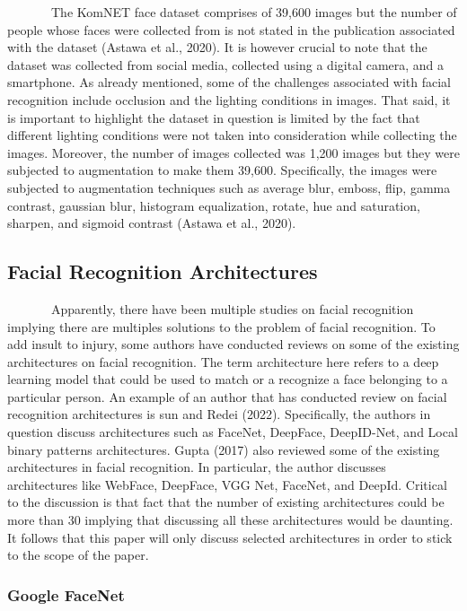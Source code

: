 \documentclass[
  12pt,
]{article}
\begin{document}
~~~~~~~The KomNET face dataset comprises of 39,600 images but the number
of people whose faces were collected from is not stated in the
publication associated with the dataset (Astawa et al., 2020). It is
however crucial to note that the dataset was collected from social
media, collected using a digital camera, and a smartphone. As already
mentioned, some of the challenges associated with facial recognition
include occlusion and the lighting conditions in images. That said, it
is important to highlight the dataset in question is limited by the fact
that different lighting conditions were not taken into consideration
while collecting the images. Moreover, the number of images collected
was 1,200 images but they were subjected to augmentation to make them
39,600. Specifically, the images were subjected to augmentation
techniques such as average blur, emboss, flip, gamma contrast, gaussian
blur, histogram equalization, rotate, hue and saturation, sharpen, and
sigmoid contrast (Astawa et al., 2020).

\subsection{Facial Recognition
Architectures}\label{facial-recognition-architectures}

~~~~~~~Apparently, there have been multiple studies on facial
recognition implying there are multiples solutions to the problem of
facial recognition. To add insult to injury, some authors have conducted
reviews on some of the existing architectures on facial recognition. The
term architecture here refers to a deep learning model that could be
used to match or a recognize a face belonging to a particular person. An
example of an author that has conducted review on facial recognition
architectures is sun and Redei (2022). Specifically, the authors in
question discuss architectures such as FaceNet, DeepFace, DeepID-Net,
and Local binary patterns architectures. Gupta (2017) also reviewed some
of the existing architectures in facial recognition. In particular, the
author discusses architectures like WebFace, DeepFace, VGG Net, FaceNet,
and DeepId. Critical to the discussion is that fact that the number of
existing architectures could be more than 30 implying that discussing
all these architectures would be daunting. It follows that this paper
will only discuss selected architectures in order to stick to the scope
of the paper.

\subsubsection{Google FaceNet}\label{google-facenet}
\end{document}
